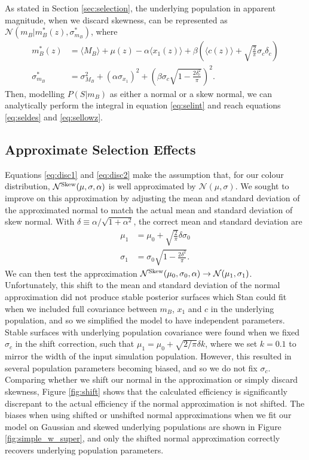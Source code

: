\documentclass[a4paper,fleqn,usenatbib]{mnras}
\begin{document}
As stated in Section \ref{sec:selection}, the underlying population in apparent magnitude, when we discard skewness, can be represented as $\mathcal{N}(m_B|m_B^*(z), \sigma^*_{m_B})$, where
\begin{align}
m_B^*(z) &= \langle M_B \rangle + \mu(z) - \alpha \langle x_1(z) \rangle + \beta \left(\langle c(z) \rangle + \sqrt{\frac{2}{\pi}}\sigma_c \delta_c\right)\label{eq:disc1} \\
\sigma^*_{m_B} &= \sigma_{M_B}^2 + (\alpha \sigma_{x_1})^2 +  \left(\beta \sigma_c \sqrt{1 - \frac{2\delta_c^2}{\pi}}\right)^2. \label{eq:disc2}
\end{align}
Then, modelling $P(S|m_B)$ as either a normal or a skew normal, we can analytically perform the integral in equation \eqref{eq:selint} and reach equations \eqref{eq:seldes} and \eqref{eq:sellowz}.





\subsection{Approximate Selection Effects}
\label{app:approx}

Equations \eqref{eq:disc1} and \eqref{eq:disc2} make the assumption that, for our colour distribution, $\mathcal{N}^{\rm Skew}(\mu, \sigma, \alpha)$ is well approximated by $\mathcal{N}(\mu, \sigma)$. We sought to improve on this approximation by adjusting the mean and standard deviation of the approximated normal to match the actual mean and standard deviation of skew normal. With $\delta \equiv \alpha/\sqrt{1+\alpha^2}$, the correct mean and standard deviation are
\begin{align}
\mu_1 &= \mu_0 + \sqrt{\frac{2}{\pi}} \delta \sigma_0 \\
\sigma_1 &= \sigma_0 \sqrt{1 - \frac{2 \delta^2}{\pi}}.
\end{align}
We can then test the approximation $\mathcal{N}^{\rm Skew}(\mu_0, \sigma_0, \alpha) \rightarrow \mathcal{N}(\mu_1, \sigma_1)$. Unfortunately, this shift to the mean and standard deviation of the normal approximation did not produce stable posterior surfaces which Stan could fit when we included full covariance between $m_B$, $x_1$ and $c$ in the underlying population, and so we simplified the model to have independent parameters. Stable surfaces with underlying population covariance were found when we fixed $\sigma_c$ in the shift correction, such that $\mu_1 = \mu_0 + \sqrt{2/\pi}\delta k$, where we set $k=0.1$ to mirror the width of the input simulation population.  However, this resulted in several population parameters becoming biased, and so we do not fix $\sigma_c$. Comparing whether we shift our normal in the approximation or simply discard skewness, Figure \ref{fig:shift} shows that the calculated efficiency is significantly discrepant to the actual efficiency if the normal approximation is not shifted. The biases when using shifted or unshifted normal approximations when we fit our model on Gaussian and skewed underlying populations are shown in Figure \ref{fig:simple_w_super}, and only the shifted normal approximation correctly recovers underlying population parameters.
\end{document}
